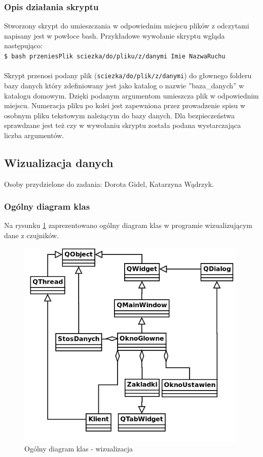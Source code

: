 \documentclass{article}
\begin{document}
\subsubsection{Opis działania skryptu}
Stworzony skrypt do umieszczania w odpowiednim miejscu plików z odczytami napisany jest w powłoce bash. Przykładowe wywołanie skryptu wgląda następująco:\\

\texttt{\$ bash przeniesPlik sciezka/do/pliku/z/danymi Imie NazwaRuchu}\\ \\
Skrypt przenosi podany plik (\texttt{sciezka/do/plik/z/danymi}) do głownego folderu bazy danych który zdefiniowany jest jako katalog o nazwie ''baza\_danych'' w katalogu domowym. Dzięki podanym argumentom umieszcza plik w odpowiednim miejscu. Numeracja pliku po kolei jest zapewniona przez prowadzenie spisu w osobnym pliku tekstowym należącym do bazy danych. Dla bezpieczeństwa sprawdzane jest też czy w wywołaniu skryptu została podana wystarczająca liczba argumentów.

\subsection{Wizualizacja danych}
Osoby przydzielone do zadania: Dorota Gidel, Katarzyna Wądrzyk.

\subsubsection{Ogólny diagram klas}
Na rysunku \ref{rys:diagram_ogolny} zaprezentowano ogólny diagram klas w programie wizualizującym dane z czujników.
\begin{figure}[H]
    \centering
    \includegraphics[width=11cm]{diagram_ogolny.png}
    \caption{Ogólny diagram klas - wizualizacja}
    \label{rys:diagram_ogolny}
\end{figure}
\end{document}
